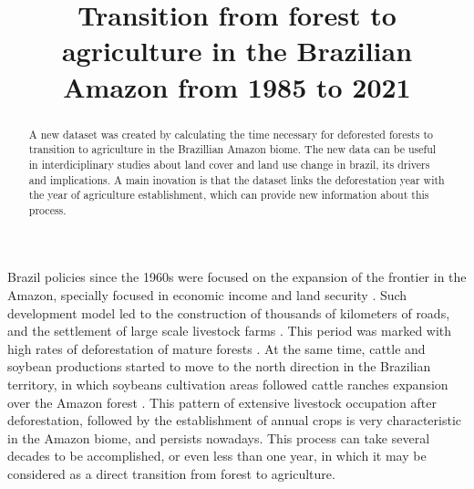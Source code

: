 \documentclass[essd, manuscript]{copernicus}
\begin{document}
\title{Transition from forest to agriculture in the Brazilian Amazon from 1985 to 2021}











\received{}
\pubdiscuss{} %
\revised{}
\accepted{}
\published{}




\maketitle


\begin{abstract}
A new dataset was created by calculating the time necessary for deforested forests to transition to agriculture in the Brazillian Amazon biome. The new data can be useful in interdiciplinary studies about land cover and land use change in brazil, its drivers and implications. A main inovation is that the dataset links the deforestation year with the year of agriculture establishment, which can provide new information about this process.
\end{abstract}




\introduction[Introduction]

Brazil policies since the 1960s were focused on the expansion of the frontier in the Amazon, specially focused in economic income and land security \citep{Carvalho2002, Mcdonald2003, Banerjee2009}. Such development model led to the construction of thousands of kilometers of roads, and the settlement of large scale livestock farms \citep{Carvalho2002, Banerjee2009}. This period was marked with high rates of deforestation of mature forests \citep{Fearnside2005}. At the same time, cattle and soybean productions started to move to the north direction in the Brazilian territory, in which soybeans cultivation areas followed cattle ranches expansion over the Amazon forest \citep{Simon2005, Barona2010, Arima2011}.
This pattern of extensive livestock occupation after deforestation, followed by the establishment of annual crops is very characteristic in the Amazon biome, and persists nowadays.
This process can take several decades to be accomplished, or even less than one year, in which it may be considered as a direct transition from forest to agriculture.
\end{document}
